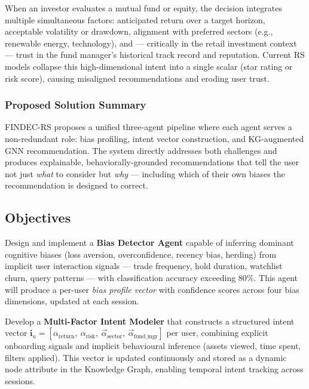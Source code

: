 \documentclass[12pt, a4paper]{article}
\begin{document}
When an investor evaluates a mutual fund or equity, the decision integrates multiple
simultaneous factors: anticipated return over a target horizon, acceptable volatility or
drawdown, alignment with preferred sectors (e.g., renewable energy, technology), and ---
critically in the retail investment context --- trust in the fund manager's historical
track record and reputation. Current RS models collapse this high-dimensional intent into
a single scalar (star rating or risk score), causing misaligned recommendations and eroding
user trust.

\subsubsection*{Proposed Solution Summary}

FINDEC-RS proposes a unified three-agent pipeline where each agent serves a
non-redundant role: bias profiling, intent vector construction, and KG-augmented GNN
recommendation. The system directly addresses both challenges and produces
explainable, behaviorally-grounded recommendations that tell the user not just
\textit{what} to consider but \textit{why} --- including which of their own biases
the recommendation is designed to correct.

\subsection{Objectives}

\begin{tcolorbox}[objbox, title={Objective 1 --- Behavioral Bias Detection and Profiling}]
Design and implement a \textbf{Bias Detector Agent} capable of inferring dominant
cognitive biases (loss aversion, overconfidence, recency bias, herding) from implicit
user interaction signals --- trade frequency, hold duration, watchlist churn, query
patterns --- with classification accuracy exceeding 80\%. This agent will produce a
per-user \textit{bias profile vector} with confidence scores across four bias dimensions,
updated at each session.
\end{tcolorbox}

\begin{tcolorbox}[objbox, title={Objective 2 --- Multi-Factor Intent Representation}]
Develop a \textbf{Multi-Factor Intent Modeler} that constructs a structured intent vector
$\mathbf{i}_u = [\alpha_{\text{return}},\ \alpha_{\text{risk}},\ \vec{\alpha}_{\text{sector}},\ \vec{\alpha}_{\text{fund\_mgr}}]$ per user, combining explicit onboarding signals and implicit
behavioural inference (assets viewed, time spent, filters applied). This vector is updated
continuously and stored as a dynamic node attribute in the Knowledge Graph, enabling
temporal intent tracking across sessions.
\end{tcolorbox}
\end{document}
